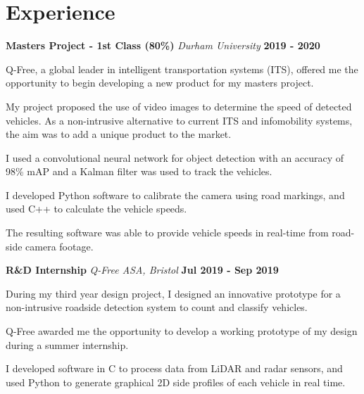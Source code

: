 \documentclass[a4paper, 11pt, hidelinks]{article}
\newcommand{\xp}[3]{
	\vspace{0.25em}
	\textbf{\large#1} \quad \emph{\large#2} \hfill \textbf{\large#3}
}
\begin{document}
\begin{minipage}{0.587\textwidth}
	\vspace{-0.25em}

	\section{Experience}
	\xp{Masters Project - 1st Class (80\%)}{Durham University}{2019 - 2020}
	\begin{itemise}

		\item Q-Free, a global leader in intelligent transportation systems (ITS), offered me the opportunity to begin developing a new product for my masters project.
		\item My project proposed the use of video images to determine the speed of detected vehicles. As a non-intrusive alternative to current ITS and infomobility systems, the aim was to add a unique product to the market.
		\item I used a convolutional neural network for object detection with an accuracy of 98\% mAP and a Kalman filter was used to track the vehicles.
		\item I developed Python software to calibrate the camera using road markings, and used C++ to calculate the vehicle speeds.
		\item The resulting software was able to provide vehicle speeds in real-time from road-side camera footage.
		\hfill
		\href{https://www.francisgurr.com/pages/masters_project/masters_project.html}{\faLink}
	\end{itemise}
	\xp{R\&D Internship}{Q-Free ASA, Bristol}{Jul 2019 - Sep 2019}
	\begin{itemise}
		\item During my third year design project, I designed an innovative prototype for a non-intrusive roadside detection system to count and classify vehicles.
		\item Q-Free awarded me the opportunity to develop a working prototype of my design during a summer internship.
		\item I developed software in C to process data from LiDAR and radar sensors, and used Python to generate graphical 2D side profiles of each vehicle in real time.

\end{itemise}
\end{minipage}
\end{document}
